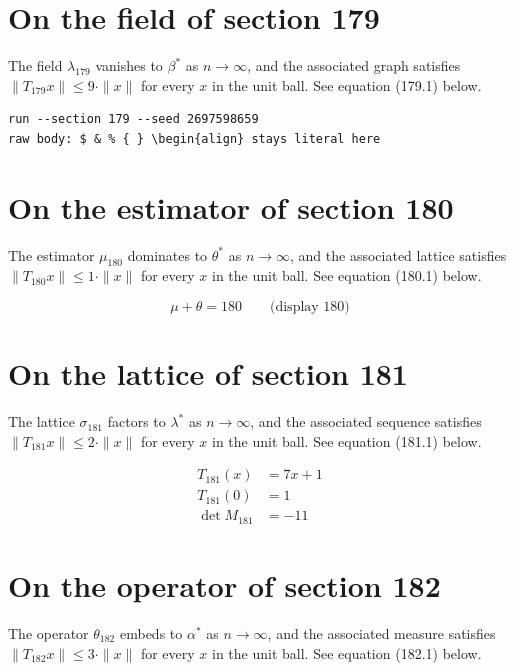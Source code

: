 \documentclass{article}
\begin{document}
\section{On the field of section 179}
The field $\lambda_{179}$ vanishes to $\beta^{*}$ as $n \to \infty$,
and the associated graph satisfies $\|T_{179} x\| \leq 9 \cdot \|x\|$
for every $x$ in the unit ball. See equation (179.1) below.

\begin{verbatim}
run --section 179 --seed 2697598659
raw body: $ & % { } \begin{align} stays literal here
\end{verbatim}

\section{On the estimator of section 180}
The estimator $\mu_{180}$ dominates to $\theta^{*}$ as $n \to \infty$,
and the associated lattice satisfies $\|T_{180} x\| \leq 1 \cdot \|x\|$
for every $x$ in the unit ball. See equation (180.1) below.

$$
\mu + \theta = 180 \qquad \text{(display 180)}
$$

\section{On the lattice of section 181}
The lattice $\sigma_{181}$ factors to $\lambda^{*}$ as $n \to \infty$,
and the associated sequence satisfies $\|T_{181} x\| \leq 2 \cdot \|x\|$
for every $x$ in the unit ball. See equation (181.1) below.

\begin{align}
T_{181}(x) &= 7 x + 1 \\
T_{181}(0) &= 1 \\
\det M_{181} &= -11
\end{align}

\section{On the operator of section 182}
The operator $\theta_{182}$ embeds to $\alpha^{*}$ as $n \to \infty$,
and the associated measure satisfies $\|T_{182} x\| \leq 3 \cdot \|x\|$
for every $x$ in the unit ball. See equation (182.1) below.
\end{document}
